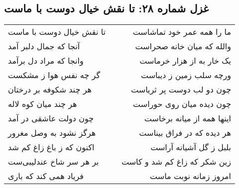 \begin{center}
\section*{غزل شماره ۲۸: تا نقش خیال دوست با ماست}
\label{sec:028}
\begin{longtable}{l p{0.5cm} r}
تا نقش خیال دوست با ماست
&&
ما را همه عمر خود تماشاست
\\
آنجا که جمال دلبر آمد
&&
والله که میان خانه صحراست
\\
وانجا که مراد دل برآمد
&&
یک خار به از هزار خرماست
\\
گر چه نفس هوا ز مشکست
&&
ورچه سلب زمین ز دیباست
\\
هر چند شکوفه بر درختان
&&
چون دو لب دوست پر ثریاست
\\
هر چند میان کوه لاله
&&
چون دیده میان روی حوراست
\\
چون دولت عاشقی در آمد
&&
اینها همه از میانه برخاست
\\
هرگز نشود به وصل مغرور
&&
هر دیده که در فراق بیناست
\\
اکنون که ز باغ زاغ کم شد
&&
بلبل ز گل آشیانه آراست
\\
بر هر سر شاخ عندلیبی‌ست
&&
زین شکر که زاغ کم شد و کاست
\\
فریاد همی کند که باری
&&
امروز زمانه نوبت ماست
\\
\end{longtable}
\end{center}
